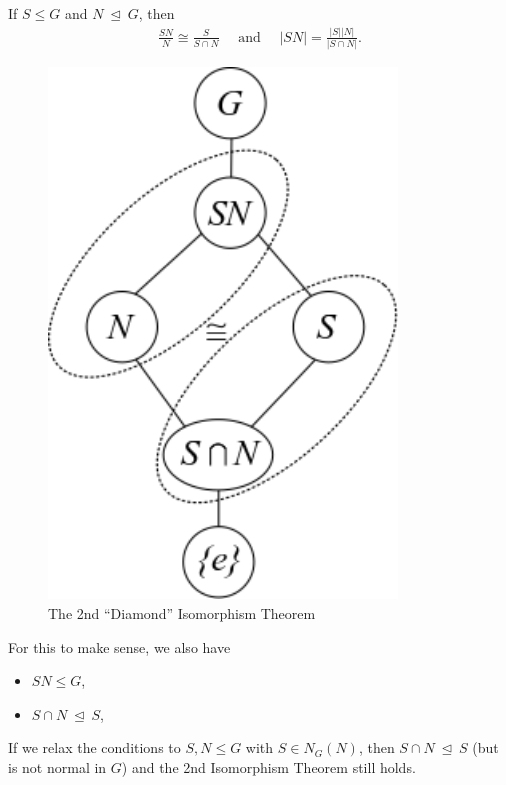 \begin{theorem}

If \(S \leq G\) and \(N {~\trianglelefteq~}G\), then
\begin{align*}
\frac{SN}{N} \cong \frac{S}{S\cap N} \quad \text{ and }\quad {\left\lvert {SN} \right\rvert} = \frac{{\left\lvert {S} \right\rvert} {\left\lvert {N} \right\rvert}}{{\left\lvert {S\cap N} \right\rvert}}
.\end{align*}

\begin{figure}
\centering
\includegraphics[width=3.64583in,height=\textheight]{figures/2020-01-01-15-20-27.png}
\caption{The 2nd ``Diamond'' Isomorphism Theorem}
\end{figure}

\end{theorem}

\begin{remark}

For this to make sense, we also have

\begin{itemize}
\tightlist
\item
  \(SN \leq G\),
\item
  \(S\cap N {~\trianglelefteq~}S\),
\end{itemize}

If we relax the conditions to \(S, N \leq G\) with \(S \in N_G(N)\),
then \(S\cap N {~\trianglelefteq~}S\) (but is not normal in \(G\)) and
the 2nd Isomorphism Theorem still holds.

\end{remark}

